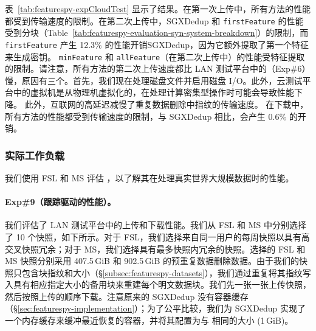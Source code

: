 表~\ref{tab:featurespy-expCloudTest} 显示了结果。在第一次上传中，所有方法的性能都受到传输速度的限制。在第二次上传中，SGXDedup 和 {\tt firstFeature} 的性能受到分块（Table~\ref{tab:featurespy-evaluation-syn-system-breakdown}）的限制，而 {\tt firstFeature} 产生 12.3\% 的性能开销SGXDedup，因为它额外提取了第一个特征来生成密钥。 {\tt minFeature} 和 {\tt allFeature}（在第二次上传中）的性能受特征提取的限制。请注意，所有方法的第二次上传速度都比 LAN 测试平台中的（Exp\#6）慢，原因有三个。首先，我们现在处理磁盘文件并启用磁盘 I/O。此外，云测试平台中的虚拟机是从物理机虚拟化的，在处理计算密集型操作时可能会导致性能下降。
此外，互联网的高延迟减慢了重复数据删除中指纹的传输速度。
在下载中，所有方法的性能都受到传输速度的限制，与 SGXDedup 相比，\prototype 会产生 0.6\% 的开销。


\subsubsection{实际工作负载}
\label{subsec:featurespy-real}
我们使用 FSL 和 MS 评估 \prototype，以了解其在处理真实世界大规模数据时的性能。

\paragraph*{Exp\#9（跟踪驱动的性能）。}
我们评估了 LAN 测试平台中的上传和下载性能。我们从 FSL 和 MS 中分别选择了 10 个快照，如下所示。对于 FSL，我们选择来自同一用户的每周快照以具有高交叉快照冗余；对于 MS，我们选择具有最多快照内冗余的快照。选择的 FSL 和 MS 快照分别采用 407.5\,GiB 和 902.5\,GiB 的预重复数据删除数据。由于我们的快照只包含块指纹和大小（\S\ref{subsec:featurespy-datasets}），我们通过重复将其指纹写入具有相应指定大小的备用块来重建每个明文数据块。我们先一张一张上传快照，然后按照上传的顺序下载。注意原来的 SGXDedup \cite{ren21} 没有容器缓存（\S\ref{sec:featurespy-implementation}）；为了公平比较，我们为 SGXDedup 实现了一个内存缓存来缓冲最近恢复的容器，并将其配置为与 \prototype 相同的大小 (1\,GiB)。


